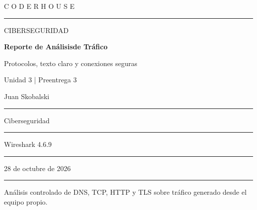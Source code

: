 \documentclass[11pt,a4paper]{article}
\begin{document}
\thispagestyle{empty}
\vspace*{1.0cm}
{\color{turquesa}\large C O D E R H O U S E}\par
\vspace{0.4cm}
{\color{linea}\rule{\textwidth}{1.2pt}}\par
\vspace{2.2cm}
{\color{gris}\Large CIBERSEGURIDAD}\par
\vspace{0.45cm}
{\color{azul}\Huge\bfseries Reporte de Análisis\newline de Tráfico}\par
\vspace{0.45cm}
{\color{turquesa}\LARGE Protocolos, texto claro y conexiones seguras}\par
\vspace{1.0cm}
{\color{gris}\large Unidad 3 | Preentrega 3}\par

\vfill
\noindent\colorbox{fondo}{%
  \begin{minipage}{\dimexpr\textwidth-2\fboxsep}
    \vspace{0.28cm}
    \noindent{}Juan Skobalski\par
    \vspace{0.18cm}\color{linea}\hrule\color{black}\vspace{0.18cm}
    \noindent{}Ciberseguridad\par
    \vspace{0.18cm}\color{linea}\hrule\color{black}\vspace{0.18cm}
    \noindent{}Wireshark 4.6.9\par
    \vspace{0.18cm}\color{linea}\hrule\color{black}\vspace{0.18cm}
    \noindent{}28 de octubre de 2026\par
    \vspace{0.28cm}
  \end{minipage}}
\vspace{0.75cm}
{\color{linea}\rule{\textwidth}{1.2pt}}\par
\vspace{0.25cm}
{\small\color{gris}Análisis controlado de DNS, TCP, HTTP y TLS sobre tráfico generado desde el equipo propio.}
\end{document}
